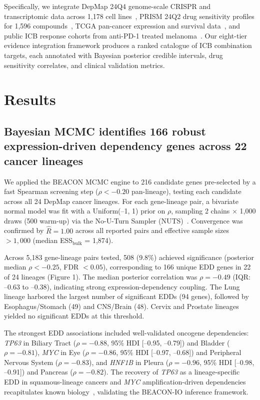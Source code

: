 \documentclass[12pt]{article}
\begin{document}
Specifically, we integrate DepMap 24Q4 genome-scale CRISPR and transcriptomic data across 1,178 cell lines~\citep{DepMap2024}, PRISM 24Q2 drug sensitivity profiles for 1,596 compounds~\citep{Corsello2020}, TCGA pan-cancer expression and survival data~\citep{TCGA2013}, and public ICB response cohorts from anti-PD-1 treated melanoma~\citep{Hugo2016}. Our eight-tier evidence integration framework produces a ranked catalogue of ICB combination targets, each annotated with Bayesian posterior credible intervals, drug sensitivity correlates, and clinical validation metrics.

\section*{Results}

\subsection*{Bayesian MCMC identifies 166 robust expression-driven dependency genes across 22 cancer lineages}

We applied the BEACON MCMC engine to 216 candidate genes pre-selected by a fast Spearman screening step ($\rho < -0.20$ pan-lineage), testing each candidate across all 24 DepMap cancer lineages. For each gene-lineage pair, a bivariate normal model was fit with a Uniform(--1, 1) prior on $\rho$, sampling 2 chains $\times$ 1,000 draws (500 warm-up) via the No-U-Turn Sampler (NUTS)~\citep{Hoffman2014}. Convergence was confirmed by $\hat{R} = 1.00$ across all reported pairs and effective sample sizes $> 1,000$ (median ESS$_\text{bulk}$ = 1,874).

Across 5,183 gene-lineage pairs tested, 508 (9.8\%) achieved significance (posterior median $\rho < -0.25$, FDR $< 0.05$), corresponding to 166 unique EDD genes in 22 of 24 lineages (Figure 1). The median posterior correlation was $\rho = -0.49$ (IQR: --0.63 to --0.38), indicating strong expression-dependency coupling. The Lung lineage harbored the largest number of significant EDDs (94 genes), followed by Esophagus/Stomach (49) and CNS/Brain (48). Cervix and Prostate lineages yielded no significant EDDs at this threshold.

The strongest EDD associations included well-validated oncogene dependencies: \textit{TP63} in Biliary Tract ($\rho = -0.88$, 95\% HDI [--0.95, --0.79]) and Bladder ($\rho = -0.81$), \textit{MYC} in Eye ($\rho = -0.86$, 95\% HDI [--0.97, --0.68]) and Peripheral Nervous System ($\rho = -0.83$), and \textit{HNF1B} in Pleura ($\rho = -0.96$, 95\% HDI [--0.98, --0.91]) and Pancreas ($\rho = -0.82$). The recovery of \textit{TP63} as a lineage-specific EDD in squamous-lineage cancers and \textit{MYC} amplification-driven dependencies recapitulates known biology~\citep{Bass2009, Soucek2013}, validating the BEACON-IO inference framework.
\end{document}
